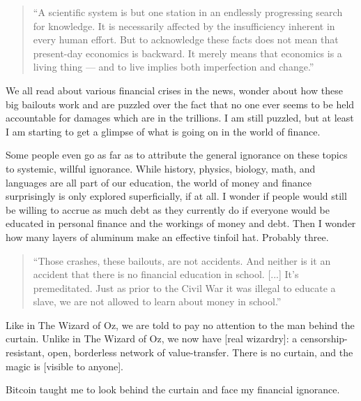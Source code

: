 \begin{quotation}
``A scientific system is but one station in an endlessly progressing
search for knowledge. It is necessarily affected by the insufficiency
inherent in every human effort. But to acknowledge these facts does
not mean that present-day economics is backward. It merely means that
economics is a living thing --- and to live implies both imperfection
and change.''
\end{quotation}

We all read about various financial crises in the news, wonder about how
these big bailouts work and are puzzled over the fact that no one ever
seems to be held accountable for damages which are in the trillions. I
am still puzzled, but at least I am starting to get a glimpse of what is
going on in the world of finance.

Some people even go as far as to attribute the general ignorance on
these topics to systemic, willful ignorance. While history, physics,
biology, math, and languages are all part of our education, the world of
money and finance surprisingly is only explored superficially, if at
all. I wonder if people would still be willing to accrue as much debt as
they currently do if everyone would be educated in personal finance and
the workings of money and debt. Then I wonder how many layers of
aluminum make an effective tinfoil hat. Probably three.

\begin{quotation}
``Those crashes, these bailouts, are not accidents. And neither is it
an accident that there is no financial education in school. [...]
It's premeditated. Just as prior to the Civil War it was illegal to
educate a slave, we are not allowed to learn about money in school.''
\end{quotation}

Like in The Wizard of Oz, we are told to pay no attention to the man
behind the curtain. Unlike in The Wizard of Oz, we now have [real
wizardry]: a censorship-resistant, open, borderless network of
value-transfer. There is no curtain, and the magic is [visible to
anyone].

Bitcoin taught me to look behind the curtain and face my financial
ignorance.

